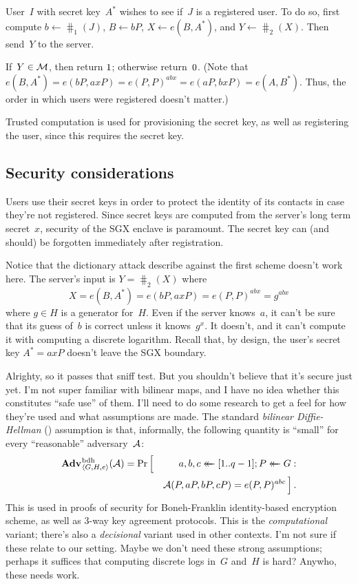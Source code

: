 \documentclass{build/llncs}
\begin{document}
%
User~$I$ with secret key~$A^*$ wishes to see if~$J$ is a registered user. To do
so, first compute $b \gets \hash_1(J)$, $B \gets bP$, $X \gets e(B, A^*)$, and
$Y \gets \hash_2(X)$.
Then send~$Y$ to the server.

%
If~$Y \in \mathcal{M}$, then return $1$; otherwise return~$0$. (Note that $e(B,
A^*) = e(bP, axP) = e(P, P)^{abx} = e(aP, bxP) = e(A, B^*)$. Thus, the order in
which users were registered doesn't matter.)

%
Trusted computation is used for provisioning the secret key, as well as
registering the user, since this requires the secret key.


\subsection*{Security considerations}

Users use their secret keys in order to protect the identity of its contacts
in case they're not registered. Since secret keys are computed from the server's
long term secret~$x$, security of the SGX enclave is paramount. The secret key
can (and should) be forgotten immediately after registration.

Notice that the dictionary attack describe against the first scheme doesn't work
here.
%
The server's input is $Y=\hash_2(X)$ where \[X = e(B, A^*) = e(bP, axP) = e(P,
P)^{abx} = g^{abx}\] where $g \in H$ is a generator for~$H$. Even if the server
knows~$a$, it can't be sure that its guess of~$b$ is correct unless it
knows~$g^x$. It doesn't, and it can't compute it with computing a discrete
logarithm.  Recall that, by design, the user's secret key $A^* = axP$ doesn't
leave the SGX boundary.

Alrighty, so it passes that sniff test. But you shouldn't believe that it's
secure just yet. I'm not super familiar with bilinear maps, and I have no idea
whether this constitutes ``safe use'' of them. I'll need to do some research to
get a feel for how they're used and what assumptions are made.
%
The standard \emph{bilinear Diffie-Hellman} (\bdh) assumption is that,
informally, the following quantity is ``small'' for every ``reasonable''
adversary~$\mathcal{A}$:
\begin{eqnarray*}
  \Adv{\bdh}_{\langle G,H,e \rangle}(\A) = \Pr \Big[
    &&
      a, b, c \getsr [1..q-1];
      P \getsr G:\\
    && \A(P, aP, bP, cP) = e(P, P)^{abc}\,
  \Big]\,.
\end{eqnarray*}
%
This is used in proofs of security for Boneh-Franklin identity-based encryption
scheme, as well as 3-way key agreement protocols.
%
This is the \emph{computational} variant; there's also a \emph{decisional}
variant used in other contexts.
%
I'm not sure if these relate to our setting.
%
Maybe we don't need these strong assumptions; perhaps it suffices that computing
discrete logs in~$G$ and~$H$ is hard?
%
Anywho, these needs work.
\end{document}
